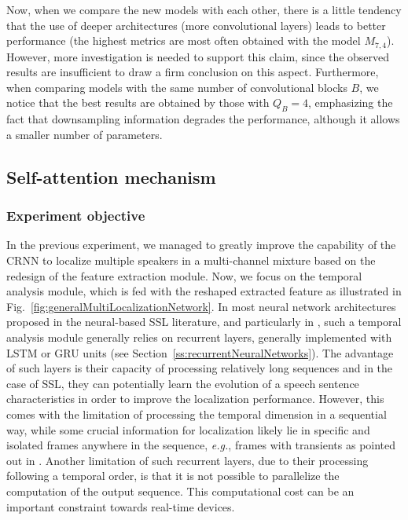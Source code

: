 Now, when we compare the new models with each other, there is a little tendency that the use of deeper architectures (more convolutional layers) leads to better performance (the highest metrics are most often obtained with the model $M_{7,4}$). However, more investigation is needed to support this claim, since the observed results are insufficient to draw a firm conclusion on this aspect. Furthermore, when comparing models with the same number of convolutional blocks $B$, we notice that the best results are obtained by those with $Q_B = 4$, emphasizing the fact that downsampling information degrades the performance, although it allows a smaller number of parameters.

\clearpage
\subsection{Self-attention mechanism}
\label{ss:multiLocalizationSelfAttention}

\subsubsection{Experiment objective}

In the previous experiment, we managed to greatly improve the capability of the CRNN to localize multiple speakers in a multi-channel mixture based on the redesign of the feature extraction module. Now, we focus on the temporal analysis module, which is fed with the reshaped extracted feature as illustrated in Fig.~\ref{fig:generalMultiLocalizationNetwork}. In most neural network architectures proposed in the neural-based SSL literature, and particularly in \cite{perotin_crnn-based_2019}, such a temporal analysis module generally relies on recurrent layers, generally implemented with LSTM or GRU units (see Section~\ref{ss:recurrentNeuralNetworks}). The advantage of such layers is their capacity of processing relatively long sequences and in the case of SSL, they can potentially learn the evolution of a speech sentence characteristics in order to improve the localization performance. However, this comes with the limitation of processing the temporal dimension in a sequential way, while some crucial information for localization likely lie in specific and isolated frames anywhere in the sequence, \emph{e.g.}, frames with transients as pointed out in \cite{perotin_localisation_2019}. Another limitation of such recurrent layers, due to their processing following a temporal order, is that it is not possible to parallelize the computation of the output sequence. This computational cost can be an important constraint towards real-time devices.

